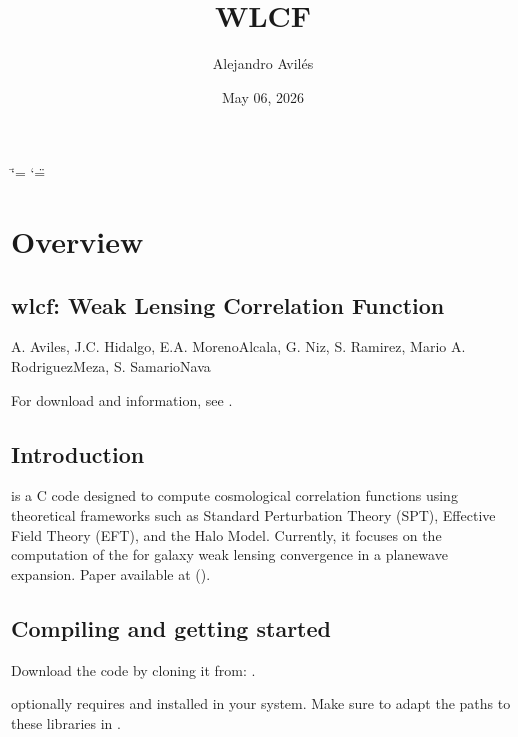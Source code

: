 \documentclass[letterpaper,10pt,english]{sphinxmanual}
\title{WLCF}
\date{May 06, 2026}
\author{Alejandro Avilés}
\begin{document}
\ifdefined\shorthandoff
  \ifnum\catcode`\=\string=\active\shorthandoff{=}\fi
  \ifnum\catcode`\"=\active{}\fi
\fi

\pagestyle{empty}
\sphinxmaketitle
\pagestyle{plain}
\sphinxtableofcontents
\pagestyle{normal}
\label{\detokenize{index::doc}}


\sphinxstepscope


\chapter{Overview}
\label{\detokenize{overview:overview}}\label{\detokenize{overview::doc}}

\section{wlcf: Weak Lensing Correlation Function}
\label{\detokenize{overview:wlcf-weak-lensing-correlation-function}}
\sphinxAtStartPar
{} A. Aviles, J.C. Hidalgo, E.A. Moreno\sphinxhyphen{}Alcala, G. Niz, S. Ramirez, Mario A. Rodriguez\sphinxhyphen{}Meza, S. Samario\sphinxhyphen{}Nava

\sphinxAtStartPar
For download and information, see  .


\section{Introduction}
\label{\detokenize{overview:introduction}}
\sphinxAtStartPar
{} is a C code designed to compute cosmological correlation functions using theoretical frameworks such as Standard Perturbation Theory (SPT), Effective Field Theory (EFT), and the Halo Model. Currently, it focuses on the computation of the  for galaxy weak lensing convergence in a plane\sphinxhyphen{}wave expansion.
Paper available at ().


\section{Compiling and getting started}
\label{\detokenize{overview:compiling-and-getting-started}}
\sphinxAtStartPar
Download the code by cloning it from:
 .

\sphinxAtStartPar
{}
 optionally requires  and  installed in your system. Make sure to adapt the paths to these libraries in .
\end{document}
